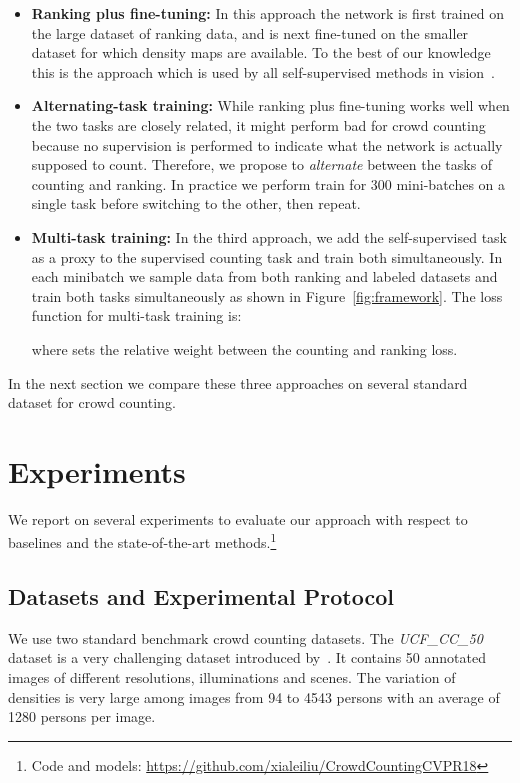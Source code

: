 \documentclass[10pt,twocolumn,letterpaper]{article}
\begin{document}
\begin{itemize}
\item \textbf{Ranking plus fine-tuning:} In this approach the network
  is first trained on the large dataset of ranking data, and is next
  fine-tuned on the smaller dataset for which density maps are
  available. To the best of our knowledge this is the approach which
  is used by all self-supervised methods in
  vision~\cite{doersch2015unsupervised,pathak2016context,zhang2016colorful,noroozi2017representation,liu2017rankiqa}.
  
\item \textbf{Alternating-task training:} While ranking plus
  fine-tuning works well when the two tasks are closely related,
  it might perform bad for crowd counting because no supervision is
  performed to indicate what the network is actually supposed to
  count. Therefore, we propose to \emph{alternate} between the tasks
  of counting and ranking. In practice we perform train for 300
  mini-batches on a single task before switching to the other, then
  repeat.  
  
\item \textbf{Multi-task training:} In the third approach, we add the
  self-supervised task as a proxy to the supervised counting task and
  train both simultaneously.  In each minibatch we sample data from
  both ranking and labeled datasets and train both tasks
  simultaneously as shown in Figure~\ref{fig:framework}. The loss
  function for multi-task training is:

where  sets the relative weight between the counting and
ranking loss. 

\end{itemize}
In the next section we compare these three approaches on several
standard dataset for crowd counting.

\section{Experiments} \label{sec:experiments}

We report on several experiments to evaluate our
approach with respect to baselines and the state-of-the-art
methods.\footnote{Code and models: \href{url}{https://github.com/xialeiliu/CrowdCountingCVPR18}}

\subsection{Datasets and Experimental Protocol}
We use two standard benchmark crowd counting datasets. The
\emph{UCF\_CC\_50} dataset is a very challenging dataset introduced
by~\cite{idrees2013multi}. It contains 50 annotated images of
different resolutions, illuminations and scenes. The variation of
densities is very large among images from 94 to 4543 persons with
an average of 1280 persons per image.
\end{document}
